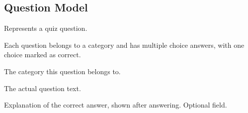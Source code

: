 \documentclass[letterpaper,10pt,english]{sphinxmanual}
\begin{document}
\subsection{Question Model}
\label{\detokenize{models:question-model}}

\begin{fulllineitems}
\label{\detokenize{models:Question}}
\pysigstartsignatures
{}
\pysigstopsignatures
\sphinxAtStartPar
Represents a quiz question.

\sphinxAtStartPar
Each question belongs to a category and has multiple choice answers,
with one choice marked as correct.

\begin{fulllineitems}
\label{\detokenize{models:Question.category}}
\pysigstartsignatures
{}
\pysigstopsignatures
\sphinxAtStartPar
The category this question belongs to.

\end{fulllineitems}


\begin{fulllineitems}
\label{\detokenize{models:Question.text}}
\pysigstartsignatures
{}
\pysigstopsignatures
\sphinxAtStartPar
The actual question text.

\end{fulllineitems}


\begin{fulllineitems}
\label{\detokenize{models:Question.explanation}}
\pysigstartsignatures
{}
\pysigstopsignatures
\sphinxAtStartPar
Explanation of the correct answer, shown after answering.
Optional field.


\end{fulllineitems}
\end{fulllineitems}
\end{document}
